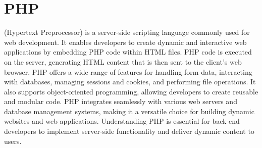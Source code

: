 \chapter{PHP}
\thispagestyle{fancy}
\lstset{}\lstset{language=php, style=phpstyle}

 (Hypertext Preprocessor) is a server-side scripting language commonly used for web development. It enables developers to create dynamic and interactive web applications by embedding PHP code within HTML files. PHP code is executed on the server, generating HTML content that is then sent to the client's web browser. PHP offers a wide range of features for handling form data, interacting with databases, managing sessions and cookies, and performing file operations. It also supports object-oriented programming, allowing developers to create reusable and modular code. PHP integrates seamlessly with various web servers and database management systems, making it a versatile choice for building dynamic websites and web applications. Understanding PHP is essential for back-end developers to implement server-side functionality and deliver dynamic content to users.